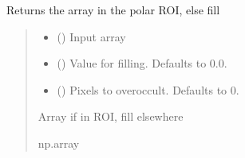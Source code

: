 \documentclass[letterpaper,10pt,english]{sphinxmanual}
\begin{document}
\begin{fulllineitems}
\begin{fulllineitems}
\end{fulllineitems}


\begin{fulllineitems}
\label{\detokenize{micropolarray:micropolarray.cameras.Camera.occulter_roi}}
\pysigstartsignatures
{}
\pysigstopsignatures
\sphinxAtStartPar
Returns the array in the polar ROI, else fill
\begin{quote}\begin{description}
\begin{itemize}
\item {} 
\sphinxAtStartPar
{} () \textendash{} Input array

\item {} 
\sphinxAtStartPar
{} (\sphinxstyleliteralemphasis{\sphinxupquote{, }}) \textendash{} Value for filling. Defaults to 0.0.

\item {} 
\sphinxAtStartPar
{} (\sphinxstyleliteralemphasis{\sphinxupquote{, }}) \textendash{} Pixels to overoccult. Defaults to 0.

\end{itemize}

\sphinxAtStartPar
Array if in ROI, fill elsewhere

\sphinxAtStartPar
np.array

\end{description}\end{quote}

\end{fulllineitems}


\end{fulllineitems}
\end{document}
